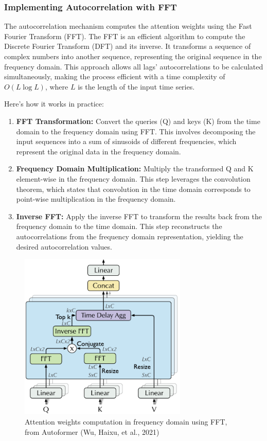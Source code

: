 \subsubsection{Implementing Autocorrelation with FFT}
The autocorrelation mechanism computes the attention weights using the Fast Fourier Transform (FFT). The FFT is an efficient algorithm to compute the Discrete Fourier Transform (DFT) and its inverse. It transforms a sequence of complex numbers into another sequence, representing the original sequence in the frequency domain. This approach allows all lags’ autocorrelations to be calculated simultaneously, making the process efficient with a time complexity of \( O(L \log L) \), where \( L \) is the length of the input time series.

Here’s how it works in practice:
\begin{enumerate}
    \item \textbf{FFT Transformation:} Convert the queries (Q) and keys (K) from the time domain to the frequency domain using FFT. This involves decomposing the input sequences into a sum of sinusoids of different frequencies, which represent the original data in the frequency domain.
    \item \textbf{Frequency Domain Multiplication:} Multiply the transformed Q and K element-wise in the frequency domain. This step leverages the convolution theorem, which states that convolution in the time domain corresponds to point-wise multiplication in the frequency domain.
    \item \textbf{Inverse FFT:} Apply the inverse FFT to transform the results back from the frequency domain to the time domain. This step reconstructs the autocorrelations from the frequency domain representation, yielding the desired autocorrelation values.
\end{enumerate}
    

\begin{figure}[htbp]
    \centering
    \includegraphics[width=8cm]{3_ChapterTranformerVariants/figuras/AttentionWeightsComputation.pdf}
    \caption{Attention weights computation in frequency domain using FFT, from Autoformer (Wu, Haixu, et al., 2021)\cite{wu2022autoformerdecompositiontransformersautocorrelation}}
    \end{figure}



